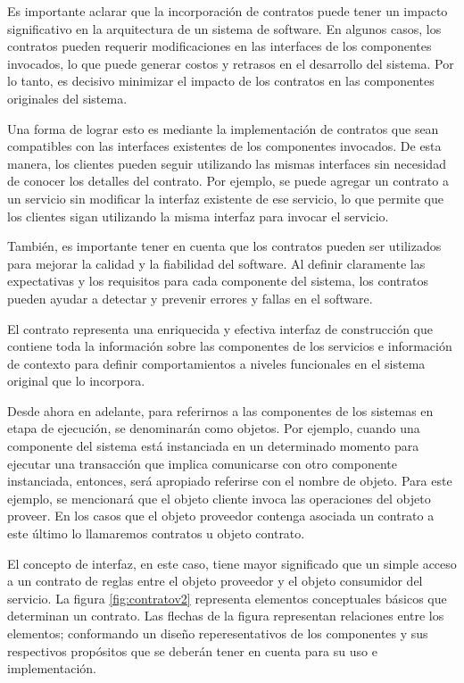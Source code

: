 Es importante aclarar que la incorporación de contratos puede tener un impacto significativo en la arquitectura de un sistema de software. En algunos casos, los contratos pueden requerir modificaciones en las interfaces de los componentes invocados, lo que puede generar costos y retrasos en el desarrollo del sistema. Por lo tanto, es decisivo minimizar el impacto de los contratos en las componentes originales del sistema.

Una forma de lograr esto es mediante la implementación de contratos que sean compatibles con las interfaces existentes de los componentes invocados. De esta manera, los clientes pueden seguir utilizando las mismas interfaces sin necesidad de conocer los detalles del contrato. Por ejemplo, se puede agregar un contrato a un servicio sin modificar la interfaz existente de ese servicio, lo que permite que los clientes sigan utilizando la misma interfaz para invocar el servicio.

También, es importante tener en cuenta que los contratos pueden ser utilizados para mejorar la calidad y la fiabilidad del software. Al definir claramente las expectativas y los requisitos para cada componente del sistema, los contratos pueden ayudar a detectar y prevenir errores y fallas en el software.

El contrato representa una enriquecida y efectiva interfaz de construcción que contiene toda la información sobre las componentes de los servicios e información de contexto para definir comportamientos a niveles funcionales en el sistema original que lo incorpora.

Desde ahora en adelante, para referirnos a las componentes de los sistemas en etapa de ejecución, se denominarán como objetos. Por ejemplo, cuando una componente del sistema está instanciada en un determinado momento para ejecutar una transacción que implica comunicarse con otro componente instanciada, entonces, será apropiado referirse con el nombre de objeto. Para este ejemplo, se mencionará que el objeto cliente invoca las operaciones del objeto proveer. En los casos que el objeto proveedor contenga asociada un contrato a este último lo llamaremos contratos u objeto contrato.


El concepto de interfaz, en este caso, tiene mayor significado que un simple acceso a un contrato de reglas entre el objeto proveedor y el objeto consumidor del servicio. La figura \ref{fig:contratov2} representa elementos conceptuales básicos que determinan un contrato. Las flechas de la figura representan relaciones entre los elementos; conformando un diseño reperesentativos de los componentes y sus respectivos propósitos que se deberán tener en cuenta para su uso e implementación. 

